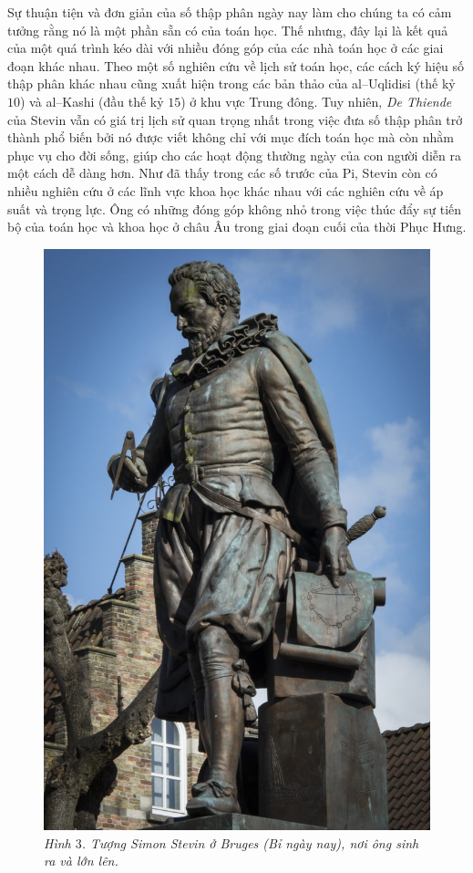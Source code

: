 \begin{multicols}{2}
	Sự thuận tiện và đơn giản của số thập phân ngày nay làm cho chúng ta có cảm tưởng rằng nó là một phần sẵn có của toán học. Thế nhưng, đây lại là kết quả của một quá trình kéo dài với nhiều đóng góp của các nhà toán học ở các giai đoạn khác nhau. Theo một số nghiên cứu về lịch sử toán học, các cách ký hiệu số thập phân khác nhau cũng xuất hiện trong các bản thảo của al--Uqlidisi (thế kỷ $10$) và al--Kashi (đầu thế kỷ $15$) ở khu vực Trung đông. Tuy nhiên, \textit{De Thiende} của Stevin vẫn có giá trị lịch sử quan trọng nhất trong việc đưa số thập phân trở thành phổ biến bởi nó được viết không chỉ với mục đích toán học mà còn nhằm phục vụ cho đời sống, giúp cho các hoạt động thường ngày của con người diễn ra một cách dễ dàng hơn. Như đã thấy trong các số trước của Pi, Stevin còn có nhiều nghiên cứu ở các lĩnh vực khoa học khác nhau với các nghiên cứu về áp suất và trọng lực. Ông có những đóng góp không nhỏ trong việc thúc đẩy sự tiến bộ của toán học và khoa học ở châu Âu trong giai đoạn cuối của thời Phục Hưng.
	\begin{figure}[H]
		\vspace*{-5pt}
		\centering
		\captionsetup{labelformat= empty, justification=centering}
		\includegraphics[width= 0.7\linewidth]{6}
		\caption{\small\textit{\color{toanhocdoisong}Hình $3$. Tượng Simon Stevin ở Bruges (Bỉ ngày nay), nơi ông sinh ra và lớn lên.}}

\end{figure}
\end{multicols}
